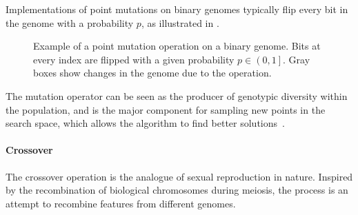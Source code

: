\documentclass[a4paper,12pt]{article}
\theoremstyle{plain}
\theoremstyle{definition}
\begin{document}
            Implementations of point mutations on binary genomes typically flip every
            bit in the genome with a probability $p$, as illustrated in 
            .
            \begin{figure}[H]
               \centering
               \caption{Example of a point mutation operation on a binary
                  genome. Bits at every index are flipped with a given
                  probability $p \in \left( 0,1 \right]$. 
                  Gray boxes show changes in the genome due to the operation.}
               \label{fig:mutation_illustration}
            \end{figure}
            
            \noindent The mutation operator can be seen as the producer of genotypic diversity within
            the population, and is the major component for sampling new points in
            the search space, which allows the algorithm to find better
            solutions~\cite{theory_of_ga}.

         \paragraph{Crossover}
            The crossover operation is the analogue of sexual
            reproduction in nature. Inspired by the recombination
            of biological chromosomes during meiosis, the process is an attempt to 
            recombine features from different genomes. 
            
\end{document}
